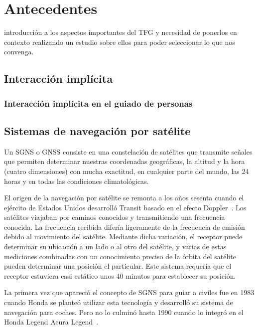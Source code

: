 \chapter{Antecedentes}
\label{chap:antecedentes}

introducción a los aspectos importantes del TFG y necesidad de ponerlos en contexto realizando un
estudio sobre ellos para poder seleccionar lo que nos convenga.

\section{Interacción implícita}


\subsection{Interacción implícita en el guiado de personas}


\section{Sistemas de navegación por satélite}

Un \acs{SGNS} o \acs{GNSS} consiste en una constelación de satélites que transmite señales que
permiten determinar nuestras coordenadas geográficas, la altitud y la hora (cuatro dimensiones) con
mucha exactitud, en cualquier parte del mundo, las 24 horas y en todas las condiciones
climatológicas.

El origen de la navegación por satélite se remonta a los años sesenta cuando el ejército de Estados
Unidos desarrolló Transit basado en el efecto Doppler~\cite{SN}. Los satélites viajaban por caminos
conocidos y transmitiendo una frecuencia conocida. La frecuencia recibida difería ligeramente de la
frecuencia de emisión debido al movimiento del satélite. Mediante dicha variación, el receptor puede
determinar su ubicación a un lado o al otro del satélite, y varias de estas mediciones combinadas
con un conocimiento preciso de la órbita del satélite pueden determinar una posición el
particular. Este sistema requería que el receptor estuviera casi estático unos 40 minutos para
establecer su posición.

La primera vez que apareció el concepto de \acs{SGNS} para guiar a civiles fue en 1983 cuando Honda
se planteó utilizar esta tecnología y desarrolló su sistema de navegación para coches. Pero no lo
culminó hasta 1990 cuando lo integró en el Honda Legend Acura Legend~\cite{Parra13}.

